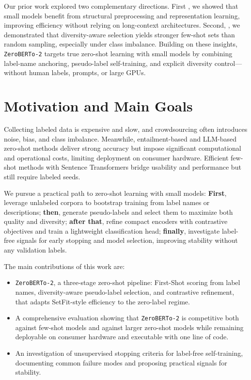 \documentclass[]{politex-xico}
\begin{document}
Our prior work explored two complementary directions. First \cite{alcoforado2022zeroberto}, we showed that small models benefit from structural preprocessing and representation learning, improving efficiency without relying on long-context architectures.  Second, \cite{alcoforado2024random,alcoforado2025estrategias}, we demonstrated that diversity-aware selection yields stronger few-shot sets than random sampling, especially under class imbalance. Building on these insights, \texttt{ZeroBERTo-2} targets true zero-shot learning with small models by combining label-name anchoring, pseudo-label self-training, and explicit diversity control—without human labels, prompts, or large GPUs.

\section{Motivation and Main Goals}
\label{sec:motivation_goals}

Collecting labeled data is expensive and slow, and crowdsourcing often introduces noise, bias, and class imbalance. Meanwhile, entailment-based and LLM-based zero-shot methods deliver strong accuracy but impose significant computational and operational costs, limiting deployment on consumer hardware. Efficient few-shot methods with Sentence Transformers bridge usability and performance but still require labeled seeds.

We pursue a practical path to zero-shot learning with small models:
\textbf{First}, leverage unlabeled corpora to bootstrap training from label names or descriptions;
\textbf{then}, generate pseudo-labels and select them to maximize both quality and diversity;
\textbf{after that}, refine compact encoders with contrastive objectives and train a lightweight classification head;
\textbf{finally}, investigate label-free signals for early stopping and model selection, improving stability without any validation labels.

The main contributions of this work are:

\begin{itemize}
    \item \texttt{ZeroBERTo-2}, a three-stage zero-shot pipeline: First-Shot scoring from label names, diversity-aware pseudo-label selection, and contrastive refinement, that adapts SetFit-style efficiency to the zero-label regime.
    \item A comprehensive evaluation showing that \texttt{ZeroBERTo-2} is competitive both against few-shot models and against larger zero-shot models while remaining deployable on consumer hardware and executable with one line of code.
    \item An investigation of unsupervised stopping criteria for label-free self-training, documenting common failure modes and proposing practical signals for stability.
\end{itemize}
\end{document}
